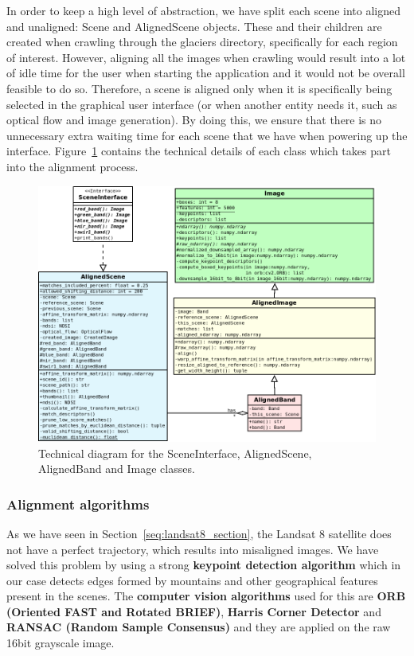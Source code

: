 \documentclass[12pt, a4paper]{report}
\begin{document}
	\par In order to keep a high level of abstraction, we have split each scene into aligned and unaligned: Scene and AlignedScene objects. These and their children are created when crawling through the glaciers directory, specifically for each region of interest. However, aligning all the images when crawling would result into a lot of idle time for the user when starting the application and it would not be overall feasible to do so. Therefore, a scene is aligned only when it is specifically being selected in the graphical user interface (or when another entity needs it, such as optical flow and image generation). By doing this, we ensure that there is no unnecessary extra waiting time for each scene that we have when powering up the interface. Figure~\ref{fig:alignment_diagram} contains the technical details of each class which takes part into the alignment process.
	
	\begin{figure}[h!]
		\centering
		\includegraphics[scale=0.45]{../images/alignment_diagram.png}
		\caption{Technical diagram for the SceneInterface, AlignedScene, AlignedBand and Image classes.}
		\label{fig:alignment_diagram}
	\end{figure}

	\subsubsection{Alignment algorithms}
	\label{seq:alignment_algorithm}
	
	\par As we have seen in Section~\ref{seq:landsat8_section}, the Landsat 8 satellite does not have a perfect trajectory, which results into misaligned images. We have solved this problem by using a strong \textbf{keypoint detection algorithm} which in our case detects edges formed by mountains and other geographical features present in the scenes. The \textbf{computer vision algorithms} used for this are \textbf{ORB (Oriented FAST and Rotated BRIEF)}, \textbf{Harris Corner Detector} and \textbf{RANSAC (Random Sample Consensus)} and they are applied on the raw 16bit grayscale image.
	
\end{document}
